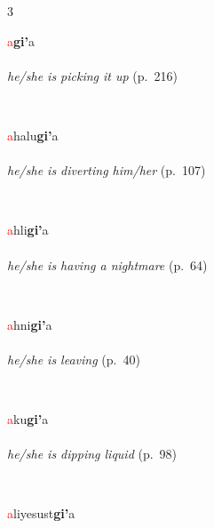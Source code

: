 \documentclass[oneside,openany]{book}%
\begin{document}
\noindent\begin{multicols}{3}%
\begin{minipage}[t]{\linewidth}
\raggedright\noindent \textcolor{Red}{a}\textbf{gi'}a\\
\noindent {\small \textsf{\textcolor{Red}{Set A}{-}\textbf{}{-}[rev-gi]}}\\
\noindent \textit{he/she is picking it up} (p.~216)
\end{minipage}\\[1em]%
\begin{minipage}[t]{\linewidth}
\raggedright\noindent \textcolor{Red}{a}halu\textbf{gi'}a\\
\\
\noindent \textit{he/she is diverting him/her} (p.~107)
\end{minipage}\\[1em]%
\begin{minipage}[t]{\linewidth}
\raggedright\noindent \textcolor{Red}{a}hli\textbf{gi'}a\\
\\
\noindent \textit{he/she is having a nightmare} (p.~64)
\end{minipage}\\[1em]%
\begin{minipage}[t]{\linewidth}
\raggedright\noindent \textcolor{Red}{a}hni\textbf{gi'}a\\
\\
\noindent \textit{he/she is leaving} (p.~40)
\end{minipage}\\[1em]%
\begin{minipage}[t]{\linewidth}
\raggedright\noindent \textcolor{Red}{a}ku\textbf{gi'}a\\
\\
\noindent \textit{he/she is dipping liquid} (p.~98)
\end{minipage}\\[1em]%
\begin{minipage}[t]{\linewidth}
\raggedright\noindent \textcolor{Red}{a}liyesust\textbf{gi'}a\\
\\

\end{minipage}
\end{multicols}
\end{document}
